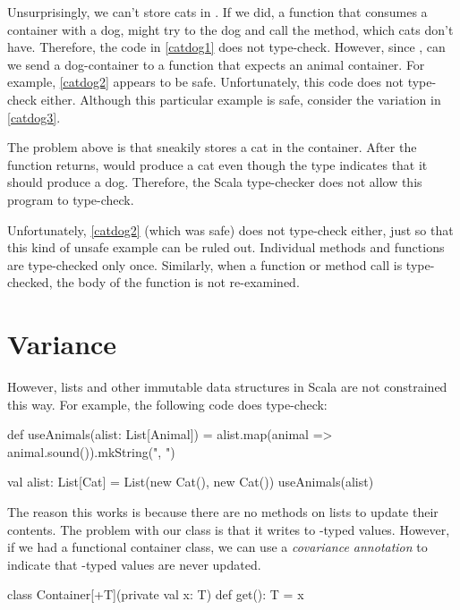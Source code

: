 \documentclass[9pt]{extbook}
\begin{document}
Unsurprisingly, we can't store cats in . If we did, a function
that consumes a container with a dog, might try to  the
dog and call the  method, which cats don't have.
Therefore, the code in \cref{catdog1} does not type-check.
However, since , can we send a dog-container
to a function that expects an animal container. For example, \cref{catdog2}
appears to be safe. Unfortunately, this code does not type-check either. Although this particular example
is safe, consider the variation in \cref{catdog3}.

The problem above is that  sneakily stores a cat in
the container. After the function returns,  would produce
a cat even though the type indicates that it should produce a dog.
Therefore, the Scala type-checker does not allow this program to type-check.

Unfortunately, \cref{catdog2} (which was safe) does not type-check either, just so that
this kind of unsafe example can be ruled out. Individual methods and functions
are type-checked only once. Similarly, when a function or method call is type-checked,
the body of the function is not re-examined.

\section{Variance}

However, lists and other immutable data structures in Scala are not constrained
this way. For example, the following code does type-check:

\begin{scalacode}
def useAnimals(alist: List[Animal]) = {
  alist.map(animal => animal.sound()).mkString(", ")
}

val alist: List[Cat] = List(new Cat(), new Cat())
useAnimals(alist)
\end{scalacode}

The reason this works is because there are no methods on lists to update
their contents. The problem with our  class is
that it writes to -typed values. However, if we had a functional
container class, we can use a \emph{covariance annotation} to indicate
that -typed values are never updated.

\begin{scalacode}
class Container[+T](private val x: T) {
  def get(): T = x
}
\end{scalacode}
\end{document}
